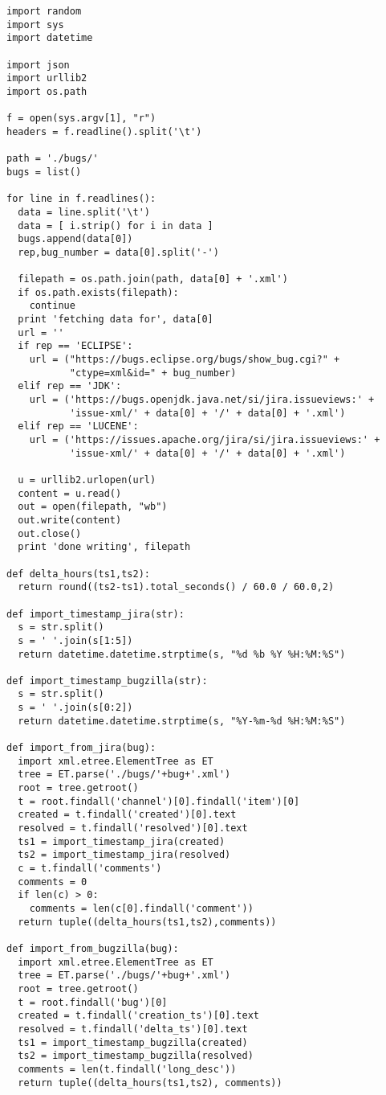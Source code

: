 \begin{appendices}
\noindent
\begin{verbatim}
import random
import sys
import datetime

import json
import urllib2
import os.path

f = open(sys.argv[1], "r")
headers = f.readline().split('\t')

path = './bugs/'
bugs = list()

for line in f.readlines():
  data = line.split('\t')
  data = [ i.strip() for i in data ]
  bugs.append(data[0])
  rep,bug_number = data[0].split('-')

  filepath = os.path.join(path, data[0] + '.xml')
  if os.path.exists(filepath):
    continue
  print 'fetching data for', data[0]
  url = ''
  if rep == 'ECLIPSE':
    url = ("https://bugs.eclipse.org/bugs/show_bug.cgi?" +
           "ctype=xml&id=" + bug_number)
  elif rep == 'JDK':
    url = ('https://bugs.openjdk.java.net/si/jira.issueviews:' +
           'issue-xml/' + data[0] + '/' + data[0] + '.xml')
  elif rep == 'LUCENE':
    url = ('https://issues.apache.org/jira/si/jira.issueviews:' +
           'issue-xml/' + data[0] + '/' + data[0] + '.xml')

  u = urllib2.urlopen(url)
  content = u.read()
  out = open(filepath, "wb")
  out.write(content)
  out.close()
  print 'done writing', filepath

def delta_hours(ts1,ts2):
  return round((ts2-ts1).total_seconds() / 60.0 / 60.0,2)

def import_timestamp_jira(str):
  s = str.split()
  s = ' '.join(s[1:5])
  return datetime.datetime.strptime(s, "%d %b %Y %H:%M:%S")

def import_timestamp_bugzilla(str):
  s = str.split()
  s = ' '.join(s[0:2])
  return datetime.datetime.strptime(s, "%Y-%m-%d %H:%M:%S")

def import_from_jira(bug):
  import xml.etree.ElementTree as ET
  tree = ET.parse('./bugs/'+bug+'.xml')
  root = tree.getroot()
  t = root.findall('channel')[0].findall('item')[0]
  created = t.findall('created')[0].text
  resolved = t.findall('resolved')[0].text
  ts1 = import_timestamp_jira(created)
  ts2 = import_timestamp_jira(resolved)
  c = t.findall('comments')
  comments = 0
  if len(c) > 0:
    comments = len(c[0].findall('comment'))
  return tuple((delta_hours(ts1,ts2),comments))

def import_from_bugzilla(bug):
  import xml.etree.ElementTree as ET
  tree = ET.parse('./bugs/'+bug+'.xml')
  root = tree.getroot()
  t = root.findall('bug')[0]
  created = t.findall('creation_ts')[0].text
  resolved = t.findall('delta_ts')[0].text
  ts1 = import_timestamp_bugzilla(created)
  ts2 = import_timestamp_bugzilla(resolved)
  comments = len(t.findall('long_desc'))
  return tuple((delta_hours(ts1,ts2), comments))


\end{verbatim}
\end{appendices}
